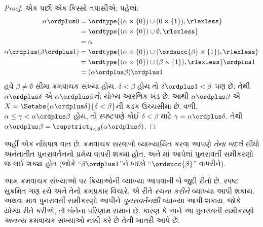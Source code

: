 \begin{proof}
એક પછી એક કિસ્સો તપાસીએ; પહેલાં:
\begin{align*}
	\alpha \ordplus  0
	& = \ordtype{(\alpha \times \{0\}) \cup (0 \times \{1\}), \rlexless} \\
	&= \ordtype{(\alpha \times \{0\}) \cup \emptyset, \rlexless}\\
	&= \alpha\\
	\alpha \ordplus (\beta \ordplus  1)
	&= \ordtype{(\alpha\times \{0\}) \cup (\ordsucc{\beta}\times \{1\}), \rlexless} \\
	&= \ordtype{(\alpha\times \{0\}) \cup (\beta \times \{1\}), \rlexless} \ordplus 1\\
	&= (\alpha \ordplus  \beta) \ordplus  1
\end{align*}
હવે $\beta \neq \emptyset$ સીમા ક્રમવાચક સંખ્યા
હોય. $\delta < \beta$ હોય તો
$\delta\ordplus 1 < \beta$ પણ છે; તેથી
$\alpha \ordplus  \delta$ એ
$\alpha \ordplus  \beta$નો યોગ્ય આરંભિક ખંડ છે.
આથી $\alpha
\ordplus  \beta$ એ
$X = \Setabs{\alpha
\ordplus  \delta}{\delta < \beta}$ની કડક ઉચ્ચસીમા
છે. વળી, $\alpha \leq \gamma <
\alpha \ordplus  \beta$ હોય, તો સ્પષ્ટપણે કોઈ
$\delta < \beta$ માટે $\gamma = \alpha \ordplus
\delta$. તેથી $\alpha \ordplus  \beta =
\supstrict_{\delta< \beta}(\alpha\ordplus \delta)$.
\end{proof}

અહીં એક નોંધપાત્ર વાત છે. ક્રમવાચક સરવાળો
વ્યાખ્યાયિત કરવા આપણે \emph{તેના બદલે} સીધો
અનંતાતીત પુનરાવર્તનનો પ્રમેય વાપરી શક્યા હોત,
અને માં આપેલાં પુનરાવર્તી
સમીકરણો જ લઈ શક્યા હોત (જોકે
``$\beta \ordplus 1$''ને બદલે
``$\ordsucc{\beta}$'' વાપરીને).

આમ ક્રમવાચક સંખ્યાઓ પર ક્રિયાઓની વ્યાખ્યા આપવાની
બે જુદી રીતો છે. સ્પષ્ટ સુક્રમિત ગણ રચે અને તેનો
ક્રમપ્રકાર વિચારે, એ રીતે \emph{રચના કરીને} વ્યાખ્યા
આપી શકાય. અથવા માત્ર પુનરાવર્તી સમીકરણો આપીને
\emph{પુનરાવર્તનથી} વ્યાખ્યા આપી શકાય. જોકે યોગ્ય
રીતે કરીએ, તો બંનેના પરિણામ સમાન છે. કારણ કે
 અને
આ પુનરાવર્તી સમીકરણો \emph{અનન્ય} ક્રમવાચક સંખ્યાઓ
નક્કી કરે છે તેની ખાતરી આપે છે.

